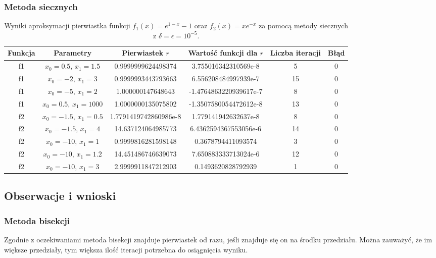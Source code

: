 \documentclass{article}
\begin{document}
\subsubsection{Metoda siecznych}
\begin{table}[H]
\begin{adjustbox}{center}
\begin{tabular}{|c|c|c|c|c|c|}
    \hline
    Funkcja & Parametry & Pierwiastek $r$ & Wartość funkcji dla $r$ & Liczba iteracji & Błąd\\
    \hline
    f1 & $x_0 = 0.5$, $x_1 = 1.5$ & 0.9999999624498374 & 3.755016342310569e-8 & 5 & 0\\
    \hline
    f1 & $x_0 = -2$, $x_1 = 3$ & 0.9999993443793663 & 6.556208484997939e-7 & 15 & 0\\
    \hline
    f1 & $x_0 = -5$, $x_1 = 2$ & 1.000000147648643 & -1.4764863220939617e-7 & 8 & 0\\
    \hline
    f1 & $x_0 = 0.5$, $x_1 = 1000$ & 1.0000000135075802 & -1.3507580054472612e-8 & 13 & 0\\
    \hline
    \hline
    f2 & $x_0 = -1.5$, $x_1 = 0.5$ & 1.7791419742860986e-8 & 1.779141942632637e-8 & 8 & 0\\
    \hline
    f2 & $x_0 = -1.5$, $x_1 = 4$ & 14.637124064985773 & 6.4362594367553056e-6 & 14 & 0\\
    \hline
    f2 & $x_0 = -10$, $x_1 = 1$ & 0.9999816281598148 & 0.3678794411093574 & 3 & 0\\
    \hline
    f2 & $x_0 = -10$, $x_1 = 1.2$ & 14.451486746639073 & 7.650883333713024e-6 & 12 & 0\\
    \hline
    f2 & $x_0 = -10$, $x_1 = 3$ & 2.9999911847212903 & 0.1493620828792939 & 1 & 0\\
    \hline
\end{tabular}
\end{adjustbox}
\caption{Wyniki aproksymacji pierwiastka funkcji \( f_1(x) = e^{1-x} - 1 \) oraz \( f_2(x) = x e^{-x} \) za pomocą metody siecznych z $\delta = \epsilon = 10^{-5}$.}
\end{table}

\subsection{Obserwacje i wnioski}
\subsubsection{Metoda bisekcji}
Zgodnie z oczekiwaniami metoda bisekcji znajduje pierwiastek od razu, jeśli znajduje się on na środku przedziału.
Można zauważyć, że im większe przedziały, tym większa ilość iteracji potrzebna do osiągnięcia wyniku.
\end{document}
